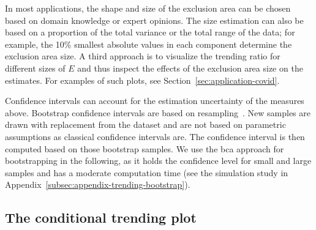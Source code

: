 In most applications, the shape and size of the exclusion area can be chosen based on domain knowledge or expert opinions.
The size estimation can also be based on a proportion of the total variance or the total range of the data; for example, the 10\% smallest absolute values in each component determine the exclusion area size.
A third approach is to visualize the trending ratio for different sizes of $E$ and thus inspect the effects of the exclusion area size on the estimates.
For examples of such plots, see Section~\ref{sec:application-covid}.

Confidence intervals can account for the estimation uncertainty of the measures above.
Bootstrap confidence intervals are based on resampling~\parencite[for introductions see][]{Hesterberg2011,Bittmann2021}.
New samples are drawn with replacement from the dataset and are not based on parametric assumptions as classical confidence intervals are.
The confidence interval is then computed based on those bootstrap samples.
We use the \ac{bca} approach for bootstrapping in the following, as it holds the confidence level for small and large samples and has a moderate computation time (see the simulation study in Appendix~\ref{subsec:appendix-trending-bootstrap}).


\subsection{The conditional trending plot}\label{subsec:trending-cond-prob}

